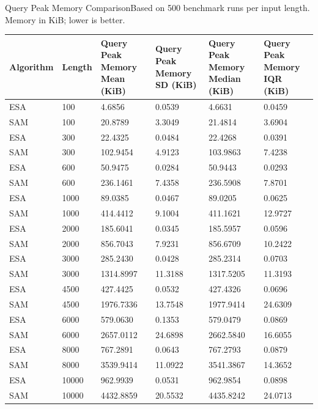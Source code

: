 \begin{benchmarktable}{Query Peak Memory Comparison}{Based on 500 benchmark runs per input length. Memory in KiB; lower is better.}
\begin{tabularx}{\textwidth}{|X|X|X|X|X|X|}
\toprule
Algorithm & Length & Query Peak Memory Mean (KiB) & Query Peak Memory SD (KiB) & Query Peak Memory Median (KiB) & Query Peak Memory IQR (KiB) \\
\midrule
ESA & 100 & 4.6856 & 0.0539 & 4.6631 & 0.0459 \\
SAM & 100 & 20.8789 & 3.3049 & 21.4814 & 3.6904 \\
\hline
ESA & 300 & 22.4325 & 0.0484 & 22.4268 & 0.0391 \\
SAM & 300 & 102.9454 & 4.9123 & 103.9863 & 7.4238 \\
\hline
ESA & 600 & 50.9475 & 0.0284 & 50.9443 & 0.0293 \\
SAM & 600 & 236.1461 & 7.4358 & 236.5908 & 7.8701 \\
\hline
ESA & 1000 & 89.0385 & 0.0467 & 89.0205 & 0.0625 \\
SAM & 1000 & 414.4412 & 9.1004 & 411.1621 & 12.9727 \\
\hline
ESA & 2000 & 185.6041 & 0.0345 & 185.5957 & 0.0596 \\
SAM & 2000 & 856.7043 & 7.9231 & 856.6709 & 10.2422 \\
\hline
ESA & 3000 & 285.2430 & 0.0428 & 285.2314 & 0.0703 \\
SAM & 3000 & 1314.8997 & 11.3188 & 1317.5205 & 11.3193 \\
\hline
ESA & 4500 & 427.4425 & 0.0532 & 427.4326 & 0.0696 \\
SAM & 4500 & 1976.7336 & 13.7548 & 1977.9414 & 24.6309 \\
\hline
ESA & 6000 & 579.0630 & 0.1353 & 579.0479 & 0.0869 \\
SAM & 6000 & 2657.0112 & 24.6898 & 2662.5840 & 16.6055 \\
\hline
ESA & 8000 & 767.2891 & 0.0643 & 767.2793 & 0.0879 \\
SAM & 8000 & 3539.9414 & 11.0922 & 3541.3867 & 14.3652 \\
\hline
ESA & 10000 & 962.9939 & 0.0531 & 962.9854 & 0.0898 \\
SAM & 10000 & 4432.8859 & 20.5532 & 4435.8242 & 24.0713 \\
\bottomrule
\end{tabularx}
\end{benchmarktable}

